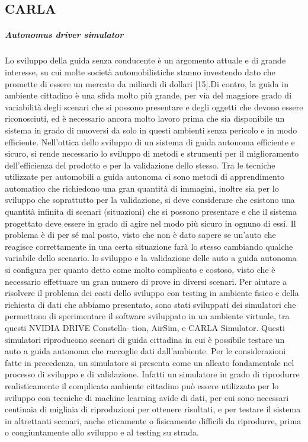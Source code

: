 \documentclass[14pt]{extarticle}
\begin{document}
\subsection{CARLA}
\subparagraph{Autonomus driver simulator}
Lo sviluppo della guida senza conducente è un argomento attuale e di
grande interesse, su cui molte società automobilistiche stanno investendo
dato che promette di essere un mercato da miliardi di dollari [15].Di contro, la guida in ambiente cittadino è una sfida
molto più grande, per via del maggiore grado di variabilità degli scenari
che si possono presentare e degli oggetti che devono essere riconosciuti,
ed è necessario ancora molto lavoro prima che sia disponibile un sistema
in grado di muoversi da solo in questi ambienti senza pericolo e in modo
efficiente.
Nell’ottica dello sviluppo di un sistema di guida autonoma efficiente
e sicuro, si rende necessario lo sviluppo di metodi e strumenti per il
miglioramento dell’efficienza del prodotto e per la validazione dello
stesso. Tra le tecniche utilizzate per automobili a guida autonoma ci sono
metodi di apprendimento automatico che richiedono una gran quantità di
immagini, inoltre sia per lo sviluppo che soprattutto per la validazione, si
deve considerare che esistono una quantità infinita di scenari (situazioni)
che si possono presentare e che il sistema progettato deve essere in grado
di agire nel modo più sicuro in ognuno di essi. Il problema è di per sé mal
posto, visto che non è dato sapere se un’auto che reagisce correttamente
in una certa situazione farà lo stesso cambiando qualche variabile dello
scenario.
lo sviluppo e la validazione delle auto a guida autonoma si configura
per quanto detto come molto complicato e costoso, visto che è necessario
effettuare un gran numero di prove in diversi scenari.
Per aiutare a risolvere il problema dei costi dello sviluppo con testing
in ambiente fisico e della richiesta di dati che abbiamo presentato, sono
stati sviluppati dei simulatori che permettono di sperimentare il software
sviluppato in un ambiente virtuale, tra questi NVIDIA DRIVE Constella-
tion, AirSim, e CARLA Simulator. Questi simulatori riproducono scenari di guida cittadina
in cui è possibile testare un auto a guida autonoma che raccoglie dati
dall’ambiente. Per le considerazioni fatte in precedenza, un simulatore
si presenta come un alleato fondamentale nel processo di sviluppo e di
validazione. Infatti un simulatore in grado di riprodurre realisticamente
il complicato ambiente cittadino può essere utilizzato per lo sviluppo
con tecniche di machine learning avide di dati, per cui sono necessari
centinaia di migliaia di riproduzioni per ottenere risultati, e per testare il
sistema in altrettanti scenari, anche eticamente o fisicamente difficili da
riprodurre, prima o congiuntamente allo sviluppo e al testing su strada.
\end{document}
